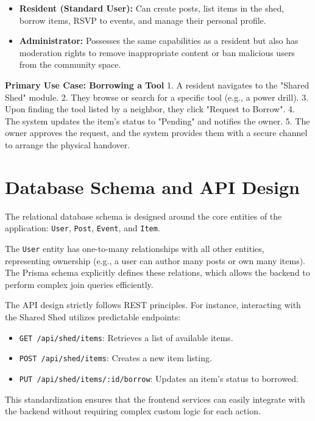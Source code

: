 \begin{itemize}
    \item \textbf{Resident (Standard User):} Can create posts, list items in the shed, borrow items, RSVP to events, and manage their personal profile.
    \item \textbf{Administrator:} Possesses the same capabilities as a resident but also has moderation rights to remove inappropriate content or ban malicious users from the community space.
\end{itemize}

\textbf{Primary Use Case: Borrowing a Tool}
1. A resident navigates to the "Shared Shed" module.
2. They browse or search for a specific tool (e.g., a power drill).
3. Upon finding the tool listed by a neighbor, they click "Request to Borrow".
4. The system updates the item's status to "Pending" and notifies the owner.
5. The owner approves the request, and the system provides them with a secure channel to arrange the physical handover.

\section{Database Schema and API Design}
The relational database schema is designed around the core entities of the application: \texttt{User}, \texttt{Post}, \texttt{Event}, and \texttt{Item}. 

The \texttt{User} entity has one-to-many relationships with all other entities, representing ownership (e.g., a user can author many posts or own many items). The Prisma schema explicitly defines these relations, which allows the backend to perform complex join queries efficiently.

The API design strictly follows REST principles. For instance, interacting with the Shared Shed utilizes predictable endpoints:
\begin{itemize}
    \item \texttt{GET /api/shed/items}: Retrieves a list of available items.
    \item \texttt{POST /api/shed/items}: Creates a new item listing.
    \item \texttt{PUT /api/shed/items/:id/borrow}: Updates an item's status to borrowed.
\end{itemize}
This standardization ensures that the frontend services can easily integrate with the backend without requiring complex custom logic for each action.
